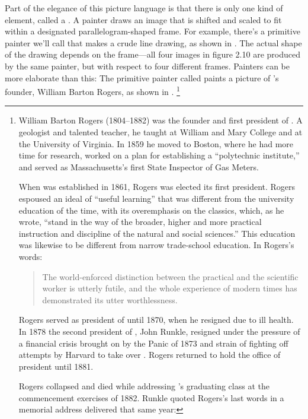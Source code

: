 Part of the elegance of this picture language is that there is only one kind of element, called a .
A painter draws an image that is shifted and scaled to fit within a designated parallelogram-shaped frame.
For example, there’s a primitive painter we’ll call  that makes a crude line drawing, as shown in .
The actual shape of the drawing depends on the frame---all four images in figure 2.10 are produced by the same  painter, but with respect to four different frames.
Painters can be more elaborate than this:
The primitive painter called  paints a picture of ’s founder, William Barton Rogers, as shown in .%
\footnote{
	William Barton Rogers (1804--1882) was the founder and first president of .
	A geologist and talented teacher, he taught at William and Mary College and at the University of Virginia.
	In 1859 he moved to Boston, where he had more time for research, worked on a plan for establishing a “polytechnic institute,” and served as Massachusetts’s first State Inspector of Gas Meters.

	When  was established in 1861, Rogers was elected its first president.
	Rogers espoused an ideal of “useful learning” that was different from the university education of the time, with its overemphasis on the classics, which, as he wrote, “stand in the way of the broader, higher and more practical instruction and discipline of the natural and social sciences.”
	This education was likewise to be different from narrow trade-school education.
	In Rogers’s words:

	\begin{quote}
		The world-enforced distinction between the practical and the scientific worker
		is utterly futile, and the whole experience of modern times has demonstrated
		its utter worthlessness.
	\end{quote}

	Rogers served as president of  until 1870, when he resigned due to ill health.
	In 1878 the second president of , John Runkle, resigned under the pressure of a financial crisis brought on by the Panic of 1873 and strain of fighting off attempts by Harvard to take over .
	Rogers returned to hold the office of president until 1881.

	Rogers collapsed and died while addressing ’s graduating class at the commencement exercises of 1882.
	Runkle quoted Rogers’s last words in a memorial address delivered that same year:

}
